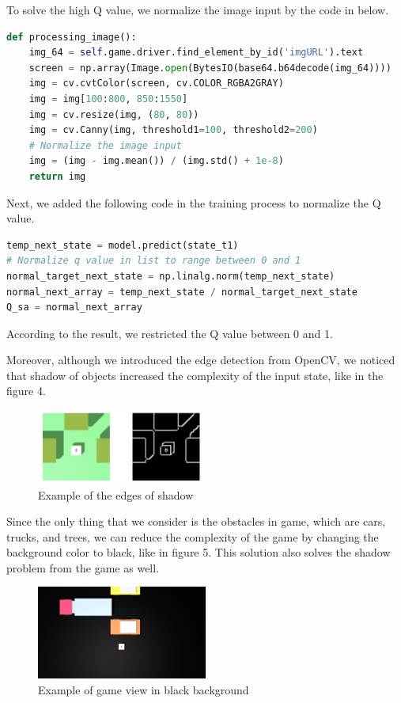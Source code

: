 \documentclass{article}
\begin{document}
To solve the high Q value, we normalize the image input by the code in below. 
\begin{lstlisting}[language=Python]
def processing_image():
    img_64 = self.game.driver.find_element_by_id('imgURL').text
    screen = np.array(Image.open(BytesIO(base64.b64decode(img_64))))
    img = cv.cvtColor(screen, cv.COLOR_RGBA2GRAY)
    img = img[100:800, 850:1550]
    img = cv.resize(img, (80, 80))
    img = cv.Canny(img, threshold1=100, threshold2=200)
    # Normalize the image input
    img = (img - img.mean()) / (img.std() + 1e-8)
    return img
\end{lstlisting}

Next, we added the following code in the training process to normalize the Q value.
\begin{lstlisting}[language=Python]
temp_next_state = model.predict(state_t1)
# Normalize q value in list to range between 0 and 1
normal_target_next_state = np.linalg.norm(temp_next_state)
normal_next_array = temp_next_state / normal_target_next_state
Q_sa = normal_next_array   
\end{lstlisting}

According to the result, we restricted the Q value between 0 and 1. \par 

Moreover, although we introduced the edge detection from OpenCV, we noticed that shadow of objects increased the complexity of the input state, like in the figure 4.

\begin{figure}[h]
    \caption{Example of the edges of shadow}
    \centering
    \includegraphics[width=0.5\textwidth]{ShadowEdge.png}
\end{figure}

Since the only thing that we consider is the obstacles in game, which are cars, trucks, and trees, we can reduce the complexity of the game by changing the background color to black, like in figure 5. This solution also solves the shadow problem from the game as well. \par 

\begin{figure}[h]
    \caption{Example of game view in black background}
    \centering
    \includegraphics[width=0.5\textwidth]{blackground.png}
\end{figure}
\end{document}
